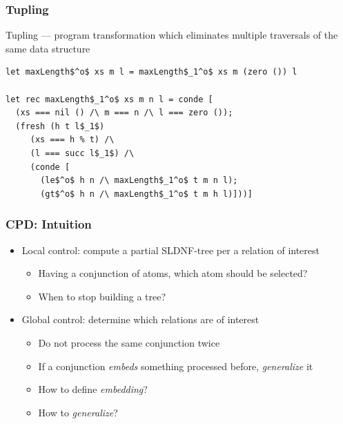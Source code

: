 \documentclass[xcolor=table]{beamer}
\begin{document}
\begin{frame}[fragile]
  \transwipe[direction=90]
  \frametitle{Tupling}
Tupling --- program transformation which eliminates multiple traversals of the same data structure

\begin{lstlisting}[basicstyle=\footnotesize]
let maxLength$^o$ xs m l = maxLength$_1^o$ xs m (zero ()) l

let rec maxLength$_1^o$ xs m n l = conde [
  (xs === nil () /\ m === n /\ l === zero ());
  (fresh (h t l$_1$)
     (xs === h % t) /\
     (l === succ l$_1$) /\
     (conde [
       (le$^o$ h n /\ maxLength$_1^o$ t m n l);
       (gt$^o$ h n /\ maxLength$_1^o$ t m h l)]))]
\end{lstlisting}


\end{frame}

\begin{frame}[fragile]
  \transwipe[direction=90]
  \frametitle{CPD: Intuition}
\begin{itemize} 
  \item Local control: compute a partial SLDNF-tree per a relation of interest
  \begin{itemize} 
    \item Having a conjunction of atoms, which atom should be selected? 
    \item When to stop building a tree? 
  \end{itemize}  
  \item Global control: determine which relations are of interest
  \begin{itemize}
    \item Do not process the same conjunction twice
    \item If a conjunction \textit{embeds} something processed before, \textit{generalize} it
    \item How to define \textit{embedding}?
    \item How to \textit{generalize}? 
  \end{itemize} 
\end{itemize}   
\end{frame}
\end{document}
